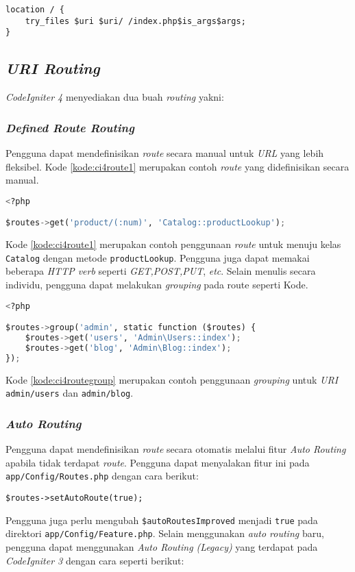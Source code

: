 \begin{lstlisting}[caption=Contoh penggunaan \texttt{try-files}. ,label=kode:tryfilesnginx]
location / {
    try_files $uri $uri/ /index.php$is_args$args;
}
\end{lstlisting}

\subsection{\textit{URI Routing}}
\textit{CodeIgniter 4} menyediakan dua buah \textit{routing} yakni:
\subsubsection{\textit{Defined Route Routing}}
Pengguna dapat mendefinisikan \textit{route} secara manual untuk \textit{URL} yang lebih fleksibel. Kode \ref{kode:ci4route1} merupakan contoh \textit{route} yang didefinisikan secara manual.
\begin{lstlisting}[language=Python,caption=Contoh \textit{route} yang didefinisikan secara manual,label=kode:ci4route1]
<?php

$routes->get('product/(:num)', 'Catalog::productLookup');
\end{lstlisting}
Kode \ref{kode:ci4route1} merupakan contoh penggunaan \textit{route} untuk menuju kelas \texttt{Catalog} dengan metode \texttt{productLookup}. Pengguna juga dapat memakai beberapa \textit{HTTP verb} seperti \textit{GET,POST,PUT}, \textit{etc}. Selain menulis secara individu, pengguna dapat melakukan \textit{grouping} pada route seperti Kode.
\begin{lstlisting}[language=Python,caption=Contoh \textit{route} yang menggunakan \textit{grouping} manual,label=kode:ci4routegroup]
<?php

$routes->group('admin', static function ($routes) {
    $routes->get('users', 'Admin\Users::index');
    $routes->get('blog', 'Admin\Blog::index');
});
\end{lstlisting}

Kode \ref{kode:ci4routegroup} merupakan contoh penggunaan \textit{grouping} untuk \textit{URI} \texttt{admin/users} dan \texttt{admin/blog}.

\subsubsection{\textit{Auto Routing}\label{subsubsec:autorouting}} 
Pengguna dapat mendefinisikan \textit{route} secara otomatis melalui fitur \textit{Auto Routing} apabila tidak terdapat \textit{route}. Pengguna dapat menyalakan  fitur ini pada \texttt{app/Config/Routes.php} dengan cara berikut:
\begin{center}
\verb|$routes->setAutoRoute(true);|
\end{center}
Pengguna juga perlu mengubah \verb|$autoRoutesImproved| menjadi \verb|true| pada direktori \verb|app/Config/Feature.php|. Selain menggunakan \textit{auto routing} baru, pengguna dapat menggunakan \textit{Auto Routing (Legacy)} yang terdapat pada \textit{CodeIgniter 3} dengan cara seperti berikut:


